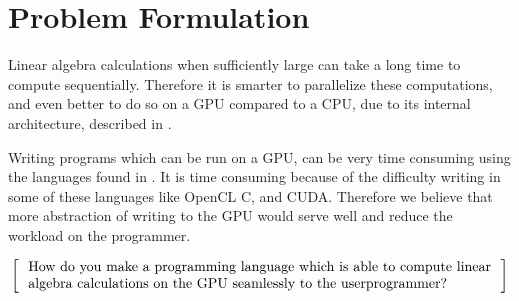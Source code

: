 \section{Problem Formulation}

Linear algebra calculations when sufficiently large can take a long time to compute sequentially. 
Therefore it is smarter to parallelize these computations, and even better to do so on a GPU compared to a CPU, due to its internal architecture, described in .

Writing programs which can be run on a GPU, can be very time consuming using the languages found in .
It is time consuming because of the difficulty writing in some of these languages like OpenCL C, and CUDA.
Therefore we believe that more abstraction of writing to the GPU would serve well and reduce the workload on the programmer.

\[
  \left[
  \begin{minipage}{\textwidth}
  \centering
  \begin{minipage}{0.96\textwidth}
  How do you make a programming language which is able to compute linear algebra calculations on the GPU seamlessly to the userprogrammer?
  \end{minipage} 
  \end{minipage}                           
    \right]
\]